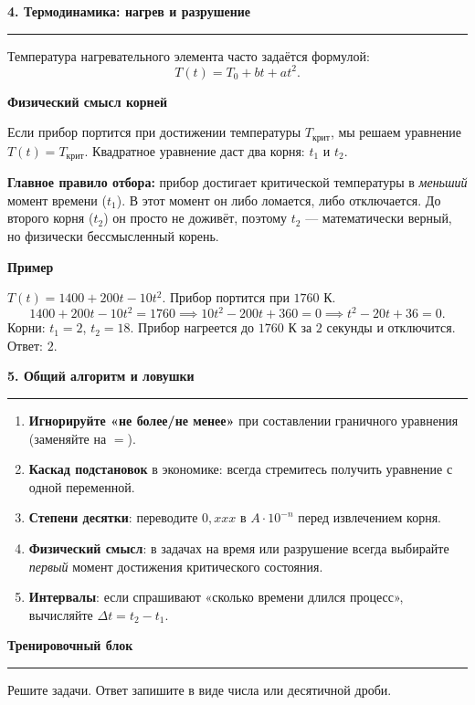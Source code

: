 \documentclass[a4paper,12pt]{article}
\newcommand{\SectionTitle}[1]{%
  \vspace{0.8em}
  {\Large\bfseries\textcolor{darkaccent}{#1}}\par
  \vspace{0.2em}
  {\color{accent}\rule{\linewidth}{0.8pt}}
  \vspace{0.4em}
}
\newcommand{\MiniTitle}[1]{%
  \vspace{0.45em}
  {\bfseries\textcolor{darkaccent}{#1}}\par
}
\newcommand{\Important}[1]{%
  \textcolor{darkaccent}{\bfseries #1}
}
\begin{document}
\SectionTitle{4. Термодинамика: нагрев и разрушение}

Температура нагревательного элемента часто задаётся формулой:
\[
T(t) = T_0 + bt + at^2.
\]

\MiniTitle{Физический смысл корней}
Если прибор портится при достижении температуры $T_{\text{крит}}$, мы решаем уравнение $T(t) = T_{\text{крит}}$.
Квадратное уравнение даст два корня: $t_1$ и $t_2$.

\Important{Главное правило отбора:} прибор достигает критической температуры в \textit{меньший} момент времени ($t_1$). В этот момент он либо ломается, либо отключается. До второго корня ($t_2$) он просто не доживёт, поэтому $t_2$ — математически верный, но физически бессмысленный корень.

\MiniTitle{Пример}
$T(t) = 1400 + 200t - 10t^2$. Прибор портится при $1760$ К.
\[
1400 + 200t - 10t^2 = 1760 \implies 10t^2 - 200t + 360 = 0 \implies t^2 - 20t + 36 = 0.
\]
Корни: $t_1 = 2$, $t_2 = 18$.
Прибор нагреется до $1760$ К за $2$ секунды и отключится. Ответ: $2$.

\SectionTitle{5. Общий алгоритм и ловушки}

\begin{enumerate}
\item \textbf{Игнорируйте «не более/не менее»} при составлении граничного уравнения (заменяйте на $=$).
\item \textbf{Каскад подстановок} в экономике: всегда стремитесь получить уравнение с одной переменной.
\item \textbf{Степени десятки}: переводите $0{,}xxx$ в $A \cdot 10^{-n}$ перед извлечением корня.
\item \textbf{Физический смысл}: в задачах на время или разрушение всегда выбирайте \textit{первый} момент достижения критического состояния.
\item \textbf{Интервалы}: если спрашивают «сколько времени длился процесс», вычисляйте $\Delta t = t_2 - t_1$.
\end{enumerate}

\newpage

\SectionTitle{Тренировочный блок}

Решите задачи. Ответ запишите в виде числа или десятичной дроби.
\end{document}
